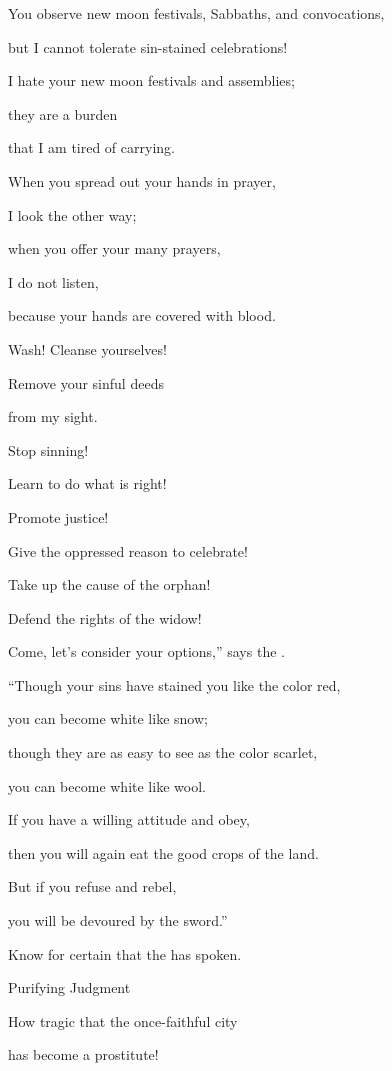 {\par }{\Q You observe new moon
festivals, Sabbaths,
and convocations,
\par }{\Q but I cannot
tolerate sin-stained
celebrations!
\par }{\Q {}I hate
your new moon
festivals
and assemblies;
\par }{\Q they are a burden
\par }{\Q that I am tired
of carrying.
\par }{\Q {}When you spread
out your hands
in prayer,
\par }{\Q I look
the other way;
\par }{\Q when
you offer your many
prayers,
\par }{\Q I do
not
listen,
\par }{\Q because
your hands
are covered
with blood.
\par }{\Q Wash! Cleanse
yourselves!
\par }{\Q Remove
your sinful
deeds
\par }{\Q from my sight.
\par }{\Q Stop
sinning!
\par }{\Q {}Learn
to do what is right!
\par }{\Q Promote
justice!
\par }{\Q Give
the oppressed
reason to celebrate!

\par }{\Q Take up the cause
of the orphan!
\par }{\Q Defend
the rights of the widow!
\par }{\Q Come,
let’s
consider
your options,” says
the {}.
\par }{\Q “Though
your sins
have stained you like the color red,
\par }{\Q you can become white
like snow;
\par }{\Q though
they are as easy to see as the color
scarlet,
\par }{\Q you can become
white like wool.
\par }{\Q {}If
you have a willing
attitude and obey,
\par }{\Q then you will again eat
the good crops
of the land.
\par }{\Q {}But if
you refuse
and rebel,
\par }{\Q you will be devoured
by the sword.”
\par }{\Q Know for
certain
that the
{}
has spoken.
\par }{\SH Purifying Judgment
\par }{\Q {}How
tragic that the once-faithful
city
\par }{\Q has become
a prostitute!

}
